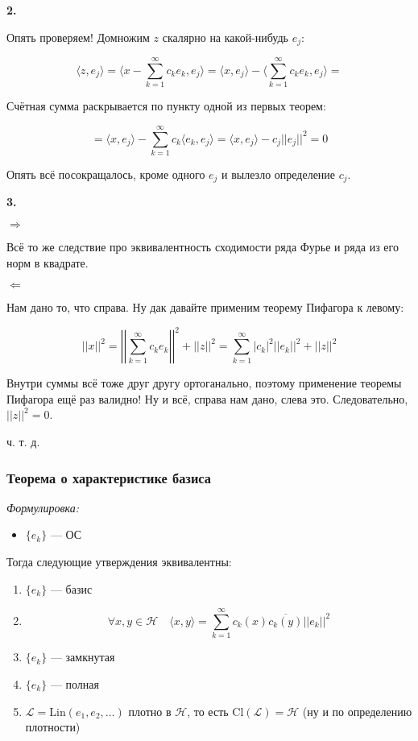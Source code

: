 \documentclass{article}
\def\sk#1#2{\langle #1, #2 \rangle}
\begin{document}
\textbf{2.}

Опять проверяем! Домножим $z$ скалярно на какой-нибудь $e_j$:

\[\sk{z}{e_j} = \sk{x - \sum_{k = 1}^{\infty} c_k e_k}{e_j} = \sk{x}{e_j} - \sk{\sum_{k = 1}^{\infty} c_k e_k}{e_j} =\]

Счётная сумма раскрывается по пункту одной из первых теорем:

\[= \sk{x}{e_j} - \sum_{k = 1}^{\infty} c_k \sk{e_k}{e_j} = \sk{x}{e_j} - c_j ||e_j||^2 = 0\]

Опять всё посокращалось, кроме одного $e_j$ и вылезло определение $c_j$.

\textbf{3. }

$\Rightarrow$

Всё то же следствие про эквивалентность сходимости ряда Фурье и ряда из его норм в квадрате.

$\Leftarrow$

Нам дано то, что справа. Ну дак давайте применим теорему Пифагора к левому:

\[||x||^2 = \left|\left| \sum_{k = 1}^{\infty} c_k e_k\right|\right|^2 + ||z||^2 = \sum_{k = 1}^{\infty} |c_k|^2||e_k||^2 + ||z||^2\]

Внутри суммы всё тоже друг другу ортоганально, поэтому применение теоремы Пифагора ещё раз валидно! Ну и всё, справа нам дано, слева это. Следовательно, $||z||^2 = 0$.

ч. т. д. 

\subsubsection{Теорема о характеристике базиса}
\textit{Формулировка:}

\begin{itemize}
    \item $\{e_k\}$ --- ОС
\end{itemize}

Тогда следующие утверждения эквивалентны:

\begin{enumerate}
    \item $\{e_k\}$ --- базис
    \item \[\forall x, y \in \mathcal{H} \quad \sk{x}{y} = \sum_{k = 1}^{\infty} c_k(x) \overline{c_k(y)} ||e_k||^2\]
    \item $\{e_k\}$ --- замкнутая
    \item $\{e_k\}$ --- полная
    \item $\mathcal{L} = \text{Lin}(e_1, e_2, \ldots)$ плотно в $\mathcal{H}$, то есть Cl$(\mathcal{L}) = \mathcal{H}$ (ну и по определению плотности)
\end{enumerate}
\end{document}
